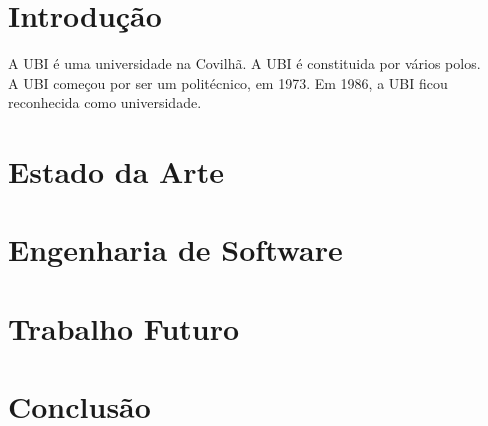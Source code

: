 \documentclass[a4paper,12pt]{report}
\begin{document}
  \tableofcontents

  \chapter{Introdução}

  \begin{acronym}[UBI]
  \end{acronym}
    
    A \ac{UBI} é uma universidade na Covilhã.
    A \ac{UBI} é constituida por vários polos. \\
    A \ac{UBI} começou por ser um politécnico, em 1973. 
    Em 1986, a \ac{UBI} ficou reconhecida como universidade.
  
  
  \chapter{Estado da Arte}
  \chapter{Engenharia de Software}
  \chapter{Trabalho Futuro}
  \chapter{Conclusão}
\end{document}
